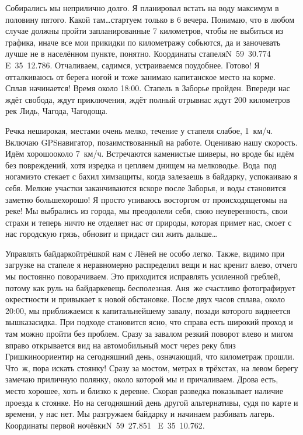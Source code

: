 Собирались мы неприлично долго. Я планировал встать на воду максимум в половину пятого. Какой там\ldots стартуем только в 6 вечера. Понимаю, что в любом случае должны пройти запланированные 7 километров, чтобы не выбиться из графика, иначе все мои прикидки по километражу собьются, да и заночевать лучше не в населённом пункте, понятно. Координаты стапеля\mdash N~59\degree~30.774\textprime~ E~35\degree~12.786\textprime. Отчаливаем, садимся, устраиваемся поудобнее. Готово! Я отталкиваюсь от берега ногой и тоже занимаю капитанское место на корме. Сплав начинается! Время около 18:00. Стапель в Заборье пройден. Впереди нас ждёт свобода, ждут приключения, ждёт полный отрыв\mdash нас ждут 200 километров рек Лидь, Чагода, Чагодоща. 

Речка неширокая, местами очень мелко, течение у стапеля слабое, 1~км/ч. Включаю GPS\sdash навигатор, позаимствованный на работе. Оцениваю нашу скорость. Идём хорошо\mdash около 7~км/ч. Встречаются каменистые шиверы, но вроде бы идём без повреждений, хотя изредка и цепляем днищем на мелководье. Вода~под ногами\mdash это стекает с бахил химзащиты, когда залезаешь в байдарку, успокаиваю я себя. Мелкие участки заканчиваются вскоре после Заборья, и воды становится заметно больше\mdash хорошо! Я просто упиваюсь восторгом от происходящего\mdash мы на реке! Мы выбрались из города, мы преодолели себя, свою неуверенность, свои страхи и теперь ничто не отделяет нас от природы, которая примет нас, смоет с нас городскую грязь, обновит и придаст сил жить дальше\ldots~

Управлять байдаркой\sdash трёшкой нам с Лёней не особо легко. Также, видимо при загрузке на стапеле я неравномерно распределил вещи и нас кренит влево, отчего мы постоянно поворачиваем. Это приходится исправлять усиленной греблей, потому как руль на байдарке\mdash вещь бесполезная. Аня~же счастливо фотографирует окрестности и привыкает к новой обстановке. После двух часов сплава, около 20:00, мы приближаемся к капитальнейшему завалу, позади которого виднеется вышка\sdash засидка. При подходе становится ясно, что справа есть широкий проход и там можно пройти  без проблем. Сразу за завалом резкий поворот влево и мигом вправо открывается вид на автомобильный мост через реку близ Гришкино\mdash ориентир на сегодняшний день, означающий, что километраж прошли. Что~ж, пора искать стоянку! Сразу за мостом, метрах в трёхстах, на левом берегу замечаю приличную полянку, около которой мы и причаливаем. Дрова есть, место хорошее, хоть и близко к деревне. Скорая разведка показывает наличие проезда к стоянке. Но на сегодняшний день другой альтернативы, судя по карте и времени, у нас нет. Мы разгружаем байдарку и начинаем разбивать лагерь. Координаты первой ночёвки\mdash N~59\degree~27.851\textprime~ E~35\degree~10.762\textprime. 

